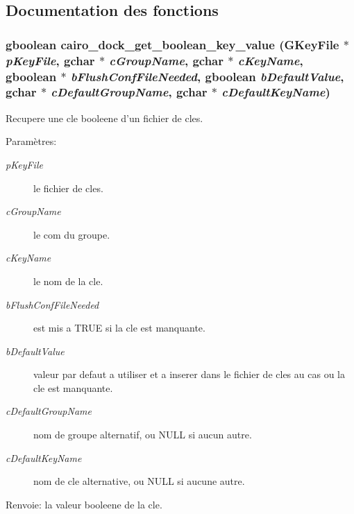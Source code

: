 \subsection{Documentation des fonctions}
\subsubsection{\setlength{\rightskip}{0pt plus 5cm}gboolean cairo\_\-dock\_\-get\_\-boolean\_\-key\_\-value (GKeyFile $\ast$ {\em pKeyFile}, gchar $\ast$ {\em cGroupName}, gchar $\ast$ {\em cKeyName}, gboolean $\ast$ {\em bFlushConfFileNeeded}, gboolean {\em bDefaultValue}, gchar $\ast$ {\em cDefaultGroupName}, gchar $\ast$ {\em cDefaultKeyName})}\label{cairo-dock-config_8h_7f221b2e5161810f62738ed51a2a732e}


Recupere une cle booleene d'un fichier de cles. \begin{Desc}
\item[Paramètres:]
\begin{description}
\item[{\em pKeyFile}]le fichier de cles. \item[{\em cGroupName}]le com du groupe. \item[{\em cKeyName}]le nom de la cle. \item[{\em bFlushConfFileNeeded}]est mis a TRUE si la cle est manquante. \item[{\em bDefaultValue}]valeur par defaut a utiliser et a inserer dans le fichier de cles au cas ou la cle est manquante. \item[{\em cDefaultGroupName}]nom de groupe alternatif, ou NULL si aucun autre. \item[{\em cDefaultKeyName}]nom de cle alternative, ou NULL si aucune autre. \end{description}
\end{Desc}
\begin{Desc}
\item[Renvoie:]la valeur booleene de la cle. \end{Desc}
